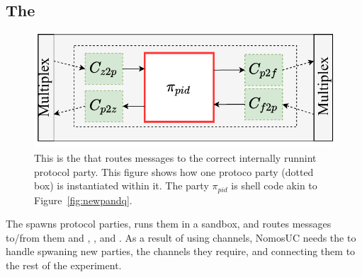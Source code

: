 \subsection{The \partywrapper}
\begin{figure}
	\centering
	\includegraphics[scale=0.5]{figures/singleshellmultiplex.pdf}
	\caption{This is the \partywrapper that routes messages to the correct internally runnint protocol party. This figure shows how one protoco party (dotted box) is instantiated within it. The party $\pi_{pid}$ is shell code akin to Figure~\ref{fig:newpandq}.}%
	\label{fig:singlemultiplex}
	\vspace{-3mm}
\end{figure}
The \partywrapper spawns protocol parties, runs them in a sandbox, and routes messages to/from them and \Z, \F, and \A.
As a result of using channels, NomosUC needs the \partywrapper to handle spwaning new parties, the channels they require, and connecting them to the rest of the experiment.

